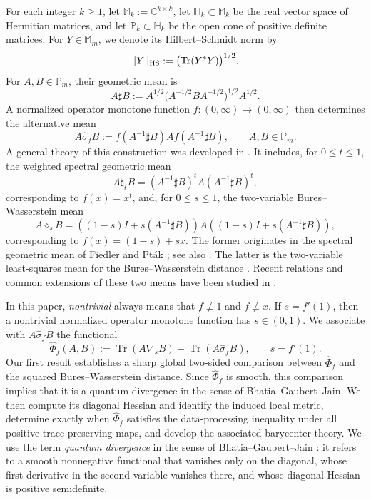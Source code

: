 \documentclass[11pt]{amsart}
\theoremstyle{definition}
\theoremstyle{remark}
\newcommand{\Pm}{\mathbb P_m}
\newcommand{\Mm}{\mathbb M_m}
\newcommand{\Tr}{\operatorname{Tr}}
\newcommand{\altPhi}{\widehat{\Phi}}
\newcommand{\hatsigma}{\widehat{\sigma}}
\begin{document}
	For each integer $k\ge1$, let $\mathbb M_k:=\mathbb C^{k\times k}$, let
	$\mathbb H_k\subset\mathbb M_k$ be the real vector space of Hermitian
	matrices, and let $\mathbb P_k\subset\mathbb H_k$ be the open cone of
	positive definite matrices.  For $Y\in\Mm$, we denote its Hilbert--Schmidt norm by
	\[
	\|Y\|_{\rm HS}:=\bigl(\Tr(Y^*Y)\bigr)^{1/2}.
	\] For $A,B\in\Pm$, their geometric mean is
	\[
	A\sharp B
	:=A^{1/2}\bigl(A^{-1/2}BA^{-1/2}\bigr)^{1/2}A^{1/2}.
	\]
	A normalized operator monotone function
	$f:(0,\infty)\to(0,\infty)$ then determines the alternative mean
	\[
	A\hatsigma_fB
	:=f(A^{-1}\sharp B)A f(A^{-1}\sharp B),
	\qquad A,B\in\Pm.
	\]
A general theory of this construction was developed in
	\cite{DumitruFrancoKimCzerwinska2026}.  It includes, for
	$0\le t\le1$, the weighted spectral geometric mean
	\[
	A\natural_tB=(A^{-1}\sharp B)^tA(A^{-1}\sharp B)^t,
	\]
	corresponding to $f(x)=x^t$, and, for $0\le s\le1$, the two-variable
	Bures--Wasserstein mean
	\[
	A\diamond_sB=((1-s)I+s(A^{-1}\sharp B))
	A((1-s)I+s(A^{-1}\sharp B)),
	\]
	corresponding to $f(x)=(1-s)+sx$.
The former originates in the spectral geometric mean of Fiedler and Pt\'ak
\cite{FiedlerPtak1997}; see also
\cite{KimLee2015,GanTam2024,GanKimSpectral2024}.  The latter is the
two-variable least-squares mean for the Bures--Wasserstein distance
\cite{BhatiaJainLim2019,HwangKim2022}.  Recent relations and common
extensions of these two means have been studied in
\cite{GanKimWasserstein2024,GanHuang2024,GanKimMer2026,
	DumitruFrancoKim2025}.
	
	In this paper, \emph{nontrivial} always means that
	$f\not\equiv1$ and $f\not\equiv x$.  If $s=f'(1)$, then a nontrivial
	normalized operator monotone function has $s\in(0,1)$. We associate with $A\hatsigma_fB$ the functional
	\[
	\altPhi_f(A,B)
	:=\Tr(A\nabla_sB)-\Tr(A\hatsigma_fB),
	\qquad s=f'(1).
	\]
	Our first result establishes a sharp global two-sided comparison between
	$\altPhi_f$ and the squared Bures--Wasserstein distance. Since
	$\altPhi_f$ is smooth, this comparison implies that it is a quantum
	divergence in the sense of Bhatia--Gaubert--Jain. We then compute its diagonal Hessian and identify the induced local metric,
	determine exactly when $\altPhi_f$ satisfies the data-processing
	inequality under all positive trace-preserving maps, and develop the
	associated barycenter theory.
	   We use the term \emph{quantum divergence} in the sense of
Bhatia--Gaubert--Jain \cite{BGJ2019}: it refers to a smooth nonnegative
functional that vanishes only on the diagonal, whose first derivative in the
second variable vanishes there, and whose diagonal Hessian is positive
semidefinite.   
	
\end{document}
